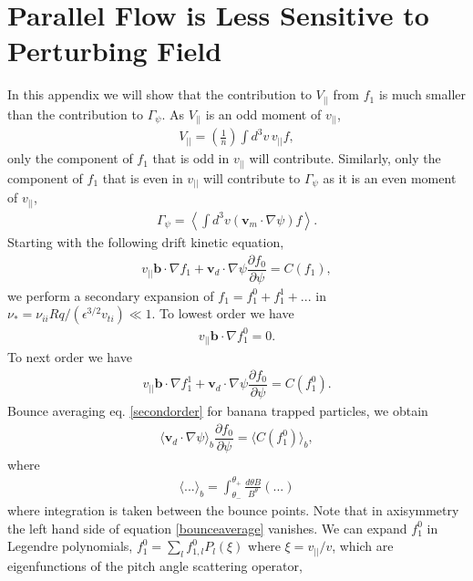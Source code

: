 \documentclass{article}
\numberwithin{figure}{section}
\numberwithin{equation}{section}
\newcommand{\partder}[2]{\dfrac{\partial  #1}{\partial  #2}} %
\begin{document}
\section{Parallel Flow is Less Sensitive to Perturbing Field} \label{parallelflow}
In this appendix we will show that the contribution to $V_{||}$ from $f_1$ is much smaller than the contribution to $\Gamma_{\psi}$. As $V_{||}$ is an odd moment of $v_{||}$,
\begin{gather}
V_{||} = \left(\frac{1}{n}\right) \int d^3 v \, v_{||} f,
\end{gather}
only the component of $f_1$ that is odd in $v_{||}$ will contribute. Similarly, only the component of $f_1$ that is even in $v_{||}$ will contribute to $\Gamma_{\psi}$ as it is an even moment of $v_{||}$,
\begin{gather}
\Gamma_{\psi} = \left \langle \int d^3v (\bm{v}_m \cdot \nabla \psi) f \right \rangle.
\end{gather}
Starting with the following drift kinetic equation,
\begin{gather}
v_{||} \bm{b} \cdot \nabla f_1 + \bm{v}_d \cdot \nabla \psi \partder{f_0}{\psi} = C(f_1),
\end{gather}
we perform a secondary expansion of $f_1 = f_1^0 + f_1^1 + ...$ in $\nu_* = \nu_{ii} Rq/(\epsilon^{3/2} v_{ti}) \ll 1$. To lowest order we have
\begin{gather}
v_{||} \bm{b} \cdot \nabla f_1^0 = 0.
\label{firstorder}
\end{gather}
To next order we have
\begin{gather}
v_{||} \bm{b} \cdot \nabla f_1^1 + \bm{v}_d \cdot \nabla \psi \partder{f_0}{\psi} = C(f_1^0).
\label{secondorder}
\end{gather}
Bounce averaging eq. \ref{secondorder} for banana trapped particles, we obtain
\begin{gather}
\langle \bm{v}_d \cdot \nabla \psi \rangle_b \partder{f_0}{\psi} = \langle C(f_1^0) \rangle_b,
\label{bounceaverage}
\end{gather}
where 
\begin{gather}
\langle ... \rangle_b = \int_{\theta_-}^{\theta_+} \frac{d \theta B}{B^{\theta}} (...)
\end{gather}
where integration is taken between the bounce points. Note that in axisymmetry the left hand side of equation \ref{bounceaverage} vanishes. We can expand $f_1^0$ in Legendre polynomials, $f_1^0 = \sum_l f_{1,l}^0 P_l(\xi)$ where $\xi = v_{||}/v$, which are eigenfunctions of the pitch angle scattering operator, 
\end{document}
